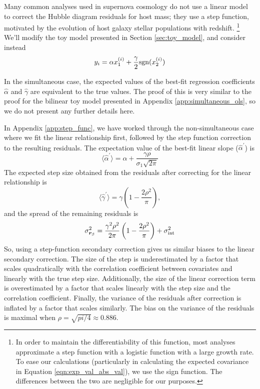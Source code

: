 Many common analyses used in supernova cosmology do not use a linear model to correct the Hubble diagram residuals for host mass; they use a step function, motivated by the evolution of host galaxy stellar populations with redshift. \footnote{In order to maintain the differentiability of this function, most analyses approximate a step function with a logistic function with a large growth rate.  To ease our calculations (particularly in calculating the expected covariance in Equation \ref{eqn:exp_val_abs_val}), we use the sign function. The differences between the two are negligible for our purposes.} We'll modify the toy model presented in Section \ref{sec:toy_model}, and consider instead
\begin{equation}
    y_i = \alpha x_1^{(i)} + \frac{\gamma}{2}\text{sgn}(x_2^{(i)})
\label{eqn:linear_and_step}
\end{equation}

In the simultaneous case, the expected values of the best-fit regression coefficients $\hat{\alpha}$ and $\hat{\gamma}$ are equivalent to the true values. The proof of this is very similar to the proof for the bilinear toy model presented in Appendix \ref{app:simultaneous_ols}, so we do not present any further details here.

In Appendix \ref{app:step_func}, we have worked through the non-simultaneous case where we fit the linear relationship first, followed by the step function correction to the resulting residuals. The expectation value of the best-fit linear slope ($\hat{\alpha}^\prime$) is
\begin{equation}
    \langle\hat{\alpha}^\prime\rangle = \alpha + \frac{\gamma\rho}{\sigma_1\sqrt{2\pi}}
    \label{eqn:slope_inflation}
\end{equation}
The expected step size obtained from the residuals after correcting for the linear relationship is
\begin{equation}
    \langle\hat{\gamma}^\prime\rangle = \gamma\left(1 - \frac{2\rho^2}{\pi}\right),
    \label{eqn:step_deflation}
\end{equation}
and the spread of the remaining residuals is
\begin{equation}
    \sigma_{\bm{r}_\beta}^2 = \frac{\gamma^2\rho^2}{2\pi}\left(1-\frac{2\rho^2}{\pi}\right) + \sigma_{\text{int}}^2
\end{equation}
So, using a step-function secondary correction gives us similar biases to the linear secondary correction. The size of the step is underestimated by a factor that scales quadratically with the correlation coefficient between covariates and linearly with the true step size. Additionally, the size of the linear correction term is overestimated by a factor that scales linearly with the step size and the correlation coefficient. Finally, the variance of the residuals after correction is inflated by a factor that scales similarly. The bias on the variance of the residuals is maximal when $\rho=\sqrt{pi/4}\approx 0.886$.

